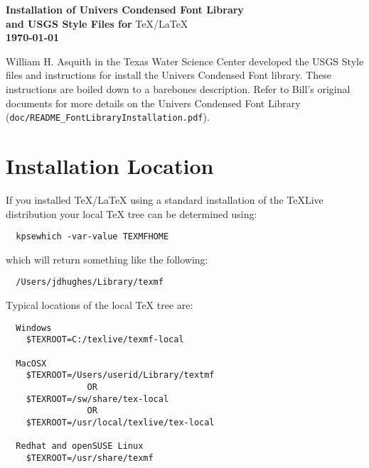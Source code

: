 \documentclass[11pt]{article}
\begin{document}
\renewcommand\sfdefault{fun}


\begin{centering}
\noindent \textsf{\bfseries \Large Installation of Univers Condensed Font Library \\ and USGS Style Files for} \TeX/\LaTeX \\
\normalsize  \textsf{\bfseries \today \\}
\end{centering}

\addvspace{\baselineskip}

William H. Asquith in the Texas Water Science Center developed the USGS Style files and instructions for install the Univers Condensed Font library. These instructions are boiled down to a barebones description. Refer to Bill's original documents for more details on the Univers Condensed Font Library (\texttt{doc/README\_FontLibraryInstallation.pdf}).

\section*{\textsf{Installation Location}}

If you installed \TeX/\LaTeX \hspace{1pt} using a standard installation of the \TeX Live distribution your local \TeX \hspace{1pt} tree can be determined using:

\begin{verbatim}
  kpsewhich -var-value TEXMFHOME
\end{verbatim}

\noindent which will return something like the following:

\begin{verbatim}
  /Users/jdhughes/Library/texmf
\end{verbatim}

\noindent Typical locations of the local \TeX \hspace{1pt} tree are:

\begin{verbatim}
  Windows
    $TEXROOT=C:/texlive/texmf-local

  MacOSX
    $TEXROOT=/Users/userid/Library/textmf
                OR
    $TEXROOT=/sw/share/tex-local
                OR
    $TEXROOT=/usr/local/texlive/tex-local

  Redhat and openSUSE Linux                          
    $TEXROOT=/usr/share/texmf
\end{verbatim}
\end{document}
